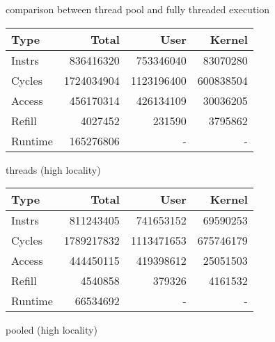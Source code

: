 \documentclass[11pt]{article}
\begin{document}
\begin{figure*}[!h]
	\caption{comparison between thread pool and fully threaded execution}
	\centering
	\begin{subtable}{.48\textwidth}
		\centering
		\begin{tabular}{ l|rrr }
			Type    & Total      & User       & Kernel    \\
			\hline
			Instrs  & 836416320  & 753346040  & 83070280  \\ 
			Cycles  & 1724034904 & 1123196400 & 600838504 \\ 
			Access  & 456170314  & 426134109  & 30036205  \\ 
			Refill  & 4027452    & 231590     & 3795862   \\ 
			Runtime & 165276806  & -          & -         \\
			\hline
		\end{tabular}
		\caption{threads (high locality)}
	\end{subtable}
	\hfill
	\begin{subtable}{.48\textwidth} 
		\centering
		\begin{tabular}{ l|rrr }
			Type    & Total      & User       & Kernel    \\
			\hline
			Instrs  & 811243405  & 741653152  & 69590253  \\ 
			Cycles  & 1789217832 & 1113471653 & 675746179 \\ 
			Access  & 444450115  & 419398612  & 25051503  \\ 
			Refill  & 4540858    & 379326     & 4161532   \\ 
			Runtime & 66534692   & -          & -         \\
			\hline
		\end{tabular}
		\caption{pooled (high locality)}        
	\end{subtable}
\end{figure*}
\end{document}
